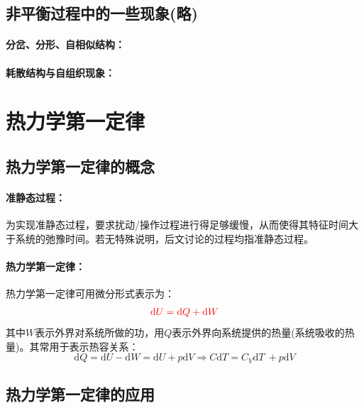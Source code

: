 \documentclass[zihao=-4,UTF8]{report}
\begin{document}
\section{非平衡过程中的一些现象(略)}
\subsubsection{分岔、分形、自相似结构：}
\subsubsection{耗散结构与自组织现象：}

\chapter{热力学第一定律}
\section{热力学第一定律的概念}
\subsubsection{准静态过程：}
为实现准静态过程，要求扰动/操作过程进行得足够缓慢，从而使得其特征时间大于系统的弛豫时间。若无特殊说明，后文讨论的过程均指准静态过程。
\subsubsection{热力学第一定律：}
热力学第一定律可用微分形式表示为：
\begin{equation}
    {\color{red}\mathrm{d}U = \mathrm{d}Q +\mathrm{d}W}
\end{equation}
其中$W$表示外界对系统所做的功，用$Q$表示外界向系统提供的热量(系统吸收的热量)。其常用于表示热容关系：
\begin{equation}
    \mathrm{d}Q = \mathrm{d}U - \mathrm{d}W = \mathrm{d}U + p \mathrm{d}V \Longrightarrow C\mathrm{d}T = C_V\mathrm{d}T \ + p \mathrm{d}V
\end{equation}
\section{热力学第一定律的应用}
\end{document}
